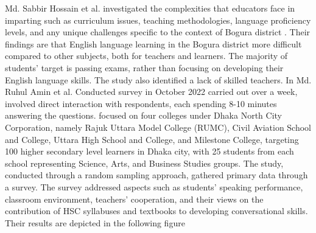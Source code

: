 \documentclass[sn-mathphys,Numbered]{sn-jnl}%
\theoremstyle{thmstyleone}%
\theoremstyle{thmstyletwo}%
\theoremstyle{thmstylethree}%
\begin{document}
Md. Sabbir Hossain et al. investigated the complexities that educators face in imparting such as curriculum issues, teaching methodologies, language proficiency levels, and any unique challenges specific to the context of Bogura district \cite{Complexities_teaching_english}. Their findings are that English language learning in the Bogura district more difficult compared to other subjects, both for teachers and learners. The majority of students' target is passing exams, rather than focusing on developing their English language skills. The study also identified a lack of skilled teachers. In \cite{Difficulties_English_Speaking} Md. Ruhul Amin et al. Conducted survey in October 2022 carried out over a week, involved direct interaction with respondents, each spending 8-10 minutes answering the questions. focused on four colleges under Dhaka North City Corporation, namely Rajuk Uttara Model College (RUMC), Civil Aviation School and College, Uttara High School and College, and Milestone College, targeting 100 higher secondary level learners in Dhaka city, with 25 students from each school representing Science, Arts, and Business Studies groups. The study, conducted through a random sampling approach, gathered primary data through a survey. The survey addressed aspects such as students' speaking performance, classroom environment, teachers' cooperation, and their views on the contribution of HSC syllabuses and textbooks to developing conversational skills. Their results are depicted in the following figure
\end{document}
